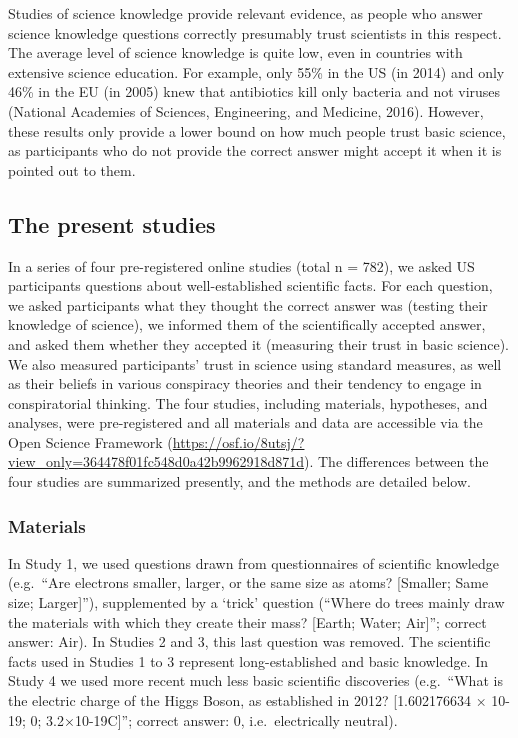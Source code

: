 \documentclass[
  doc,floatsintext]{apa6}
\begin{document}
Studies of science knowledge provide relevant evidence, as people who answer science knowledge questions correctly presumably trust scientists in this respect. The average level of science knowledge is quite low, even in countries with extensive science education. For example, only 55\% in the US (in 2014) and only 46\% in the EU (in 2005) knew that antibiotics kill only bacteria and not viruses (National Academies of Sciences, Engineering, and Medicine, 2016). However, these results only provide a lower bound on how much people trust basic science, as participants who do not provide the correct answer might accept it when it is pointed out to them.

\subsection{The present studies}\label{the-present-studies}

In a series of four pre-registered online studies (total n = 782), we asked US participants questions about well-established scientific facts. For each question, we asked participants what they thought the correct answer was (testing their knowledge of science), we informed them of the scientifically accepted answer, and asked them whether they accepted it (measuring their trust in basic science). We also measured participants' trust in science using standard measures, as well as their beliefs in various conspiracy theories and their tendency to engage in conspiratorial thinking. The four studies, including materials, hypotheses, and analyses, were pre-registered and all materials and data are accessible via the Open Science Framework (\url{https://osf.io/8utsj/?view_only=364478f01fc548d0a42b9962918d871d}). The differences between the four studies are summarized presently, and the methods are detailed below.

\subsubsection{Materials}\label{materials}

In Study 1, we used questions drawn from questionnaires of scientific knowledge (e.g.~``Are electrons smaller, larger, or the same size as atoms? {[}Smaller; Same size; Larger{]}''), supplemented by a `trick' question (``Where do trees mainly draw the materials with which they create their mass? {[}Earth; Water; Air{]}''; correct answer: Air). In Studies 2 and 3, this last question was removed. The scientific facts used in Studies 1 to 3 represent long-established and basic knowledge. In Study 4 we used more recent much less basic scientific discoveries (e.g.~``What is the electric charge of the Higgs Boson, as established in 2012? {[}1.602176634 × 10-19; 0; 3.2×10-19C{]}''; correct answer: 0, i.e.~electrically neutral).
\end{document}
